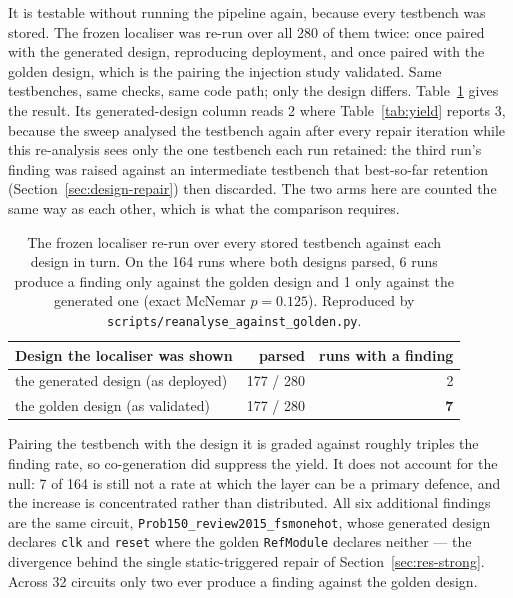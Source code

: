 \documentclass[11pt,a4paper,titlepage=false]{scrreprt}
\begin{document}
It is testable without running the pipeline again, because every testbench was stored. The
frozen localiser was re-run over all 280 of them twice: once paired with the generated
design, reproducing deployment, and once paired with the golden design, which is the pairing
the injection study validated. Same testbenches, same checks, same code path; only the design
differs. Table~\ref{tab:golden-reanalysis} gives the result. Its generated-design column
reads 2 where Table~\ref{tab:yield} reports 3, because the sweep analysed the testbench again
after every repair iteration while this re-analysis sees only the one testbench each run
retained: the third run's finding was raised against an intermediate testbench that
best-so-far retention (Section~\ref{sec:design-repair}) then discarded. The two arms here are
counted the same way as each other, which is what the comparison requires.

\begin{table}[H]
\centering
\small
\begin{tabular}{@{}l r r@{}}
\toprule
\textbf{Design the localiser was shown} & \textbf{parsed} & \textbf{runs with a finding} \\
\midrule
the generated design (as deployed)      & 177 / 280 & 2 \\
the golden design (as validated)        & 177 / 280 & \textbf{7} \\
\bottomrule
\end{tabular}
\caption{The frozen localiser re-run over every stored testbench against each design in turn.
On the 164 runs where both designs parsed, 6 runs produce a finding only against the golden
design and 1 only against the generated one (exact McNemar $p=0.125$). Reproduced by
\texttt{scripts/reanalyse\_against\_golden.py}.}
\label{tab:golden-reanalysis}
\end{table}

Pairing the testbench with the design it is graded against roughly triples the finding rate,
so co-generation did suppress the yield. It does not account for the null: 7 of 164 is still
not a rate at which the layer can be a primary defence, and the increase is concentrated
rather than distributed. All six additional findings are the same circuit,
\texttt{Prob150\_\allowbreak review2015\_\allowbreak fsmonehot}, whose generated design
declares \texttt{clk} and \texttt{reset} where the golden \texttt{RefModule} declares
neither --- the divergence behind the single static-triggered repair of
Section~\ref{sec:res-strong}. Across 32 circuits only two ever produce a finding against the
golden design.
\end{document}
